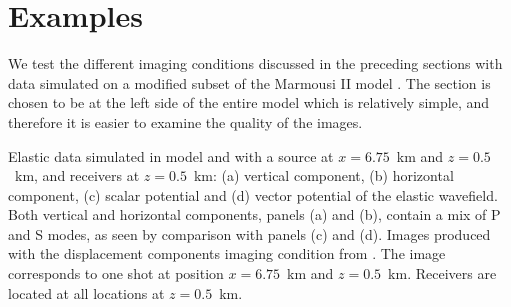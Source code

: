 \section{Examples}

We test the different imaging conditions discussed in the preceding
sections with data simulated on a modified subset of the Marmousi II
model \cite[]{martin:1979}. The section is chosen to be at the left
side of the entire model which is relatively simple, and therefore it
is easier to examine the quality of the images.


 {Elastic
  data simulated in model  and 
  with a source at $x=6.75$~km and $z=0.5$~km, and receivers at
  $z=0.5$~km: (a) vertical component, (b) horizontal component, (c)
  scalar potential and (d) vector potential of the elastic
  wavefield. Both vertical and horizontal components, panels (a) and
  (b), contain a mix of P and S modes, as seen by comparison with
  panels (c) and (d).}
          {Images produced with the displacement components imaging
            condition from .  The image corresponds to one shot at
            position $x=6.75$~km and $z=0.5$~km. Receivers are located
            at all locations at $z=0.5$~km.}


